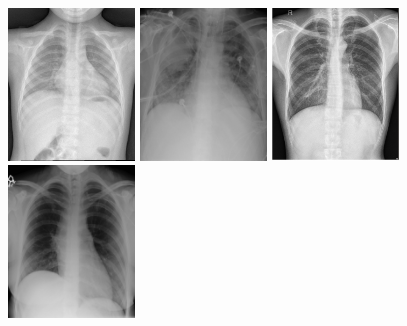 \documentclass[12pt,oneside,a4paper]{report}
\begin{document}
\begin{figure}
  \centering
  \includegraphics[width=0.3\textwidth]{images/normal1}\hspace{0.01\textwidth}%
  \includegraphics[width=0.3\textwidth]{images/consolidation_original}\hspace{0.01\textwidth}%
  \includegraphics[width=0.3\textwidth]{images/TB_original}\\[0.01\textwidth]
  \includegraphics[width=0.3\textwidth]{images/normal2}\hspace{0.01\textwidth}%

\end{figure}
\end{document}

